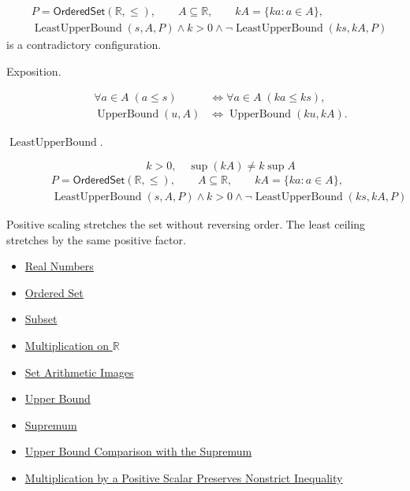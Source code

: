 \begin{remark*}
\[
\begin{aligned}
&P=\mathsf{OrderedSet}(\mathbb{R},\leq),\qquad A\subseteq\mathbb{R},\qquad kA=\{ka:a\in A\},\\
&\operatorname{LeastUpperBound}(s,A,P)\land k>0\land
\neg\operatorname{LeastUpperBound}(ks,kA,P)
\end{aligned}
\]
is a contradictory configuration.
\end{remark*}

\begin{remark*}
\begin{description}
  \item[Exposition.]
\[
\begin{aligned}
\forall a\in A\;(a\leq s)
&\Longleftrightarrow
\forall a\in A\;(ka\leq ks),\\
\operatorname{UpperBound}(u,A)
&\Longleftrightarrow
\operatorname{UpperBound}(ku,kA).
\end{aligned}
\]


  \item[\(\operatorname{LeastUpperBound}.\)]
  \[
k>0,\quad \sup(kA)\ne k\sup A
\]
\[
\begin{aligned}
&P=\mathsf{OrderedSet}(\mathbb{R},\leq),\qquad A\subseteq\mathbb{R},\qquad kA=\{ka:a\in A\},\\
&\operatorname{LeastUpperBound}(s,A,P)\land k>0\land
\neg\operatorname{LeastUpperBound}(ks,kA,P)
\end{aligned}
\]
\end{description}
\end{remark*}

\begin{remark*}[Interpretation]
Positive scaling stretches the set without reversing order. The least ceiling stretches by the same positive factor.
\end{remark*}

\begin{dependencies}
\begin{itemize}
  \item \hyperref[def:reals]{Real Numbers}
  \item \hyperref[def:ordered-set]{Ordered Set}
  \item \hyperref[def:subset]{Subset}
  \item \hyperref[def:multiplication-on-r]{Multiplication on $\mathbb{R}$}
  \item \hyperref[def:set-arithmetic-images]{Set Arithmetic Images}
  \item \hyperref[def:real-upper-bound]{Upper Bound}
  \item \hyperref[def:supremum]{Supremum}
  \item \hyperref[prop:upper-bound-comparison-with-the-supremum]{Upper Bound Comparison with the Supremum}
  \item \hyperref[thm:ineq-nonstrict-multiply-positive]{Multiplication by a Positive Scalar Preserves Nonstrict Inequality}
\end{itemize}
\end{dependencies}

